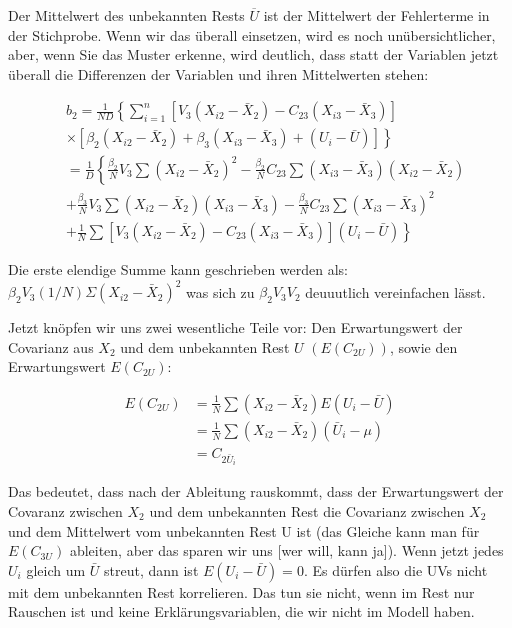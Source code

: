 \documentclass[
  10pt,
  letterpaper,
  a4paper, twoside]{scrreprt}
\begin{document}
\begin{tcolorbox}
Der Mittelwert des unbekannten Rests \(\overline{U}\) ist der Mittelwert
der Fehlerterme in der Stichprobe. Wenn wir das überall einsetzen, wird
es noch unübersichtlicher, aber, wenn Sie das Muster erkenne, wird
deutlich, dass statt der Variablen jetzt überall die Differenzen der
Variablen und ihren Mittelwerten stehen:

\begin{align}
& b_2=\frac{1}{N D}\left\{\sum_{i=1}^n\left[V_3\left(X_{i 2}-\bar{X}_2\right)-C_{23}\left(X_{i 3}-\bar{X}_3\right)\right]\right. \\
&\left.\times\left[\beta_2\left(X_{i 2}-\bar{X}_2\right)+\beta_3\left(X_{i 3}-\bar{X}_3\right)+\left(U_i-\bar{U}\right)\right]\right\} \\
&=\frac{1}{D}\left\{\frac{\beta_2}{N} V_3 \sum\left(X_{i 2}-\bar{X}_2\right)^2-\frac{\beta_2}{N} C_{23} \sum\left(X_{i 3}-\bar{X}_3\right)\left(X_{i 2}-\bar{X}_2\right)\right. \\
&+\frac{\beta_3}{N} V_3 \sum\left(X_{i 2}-\bar{X}_2\right)\left(X_{i 3}-\bar{X}_3\right)-\frac{\beta_3}{N} C_{23} \sum\left(X_{i 3}-\bar{X}_3\right)^2 \\
&\left.+\frac{1}{N} \sum\left[V_3\left(X_{i 2}-\bar{X}_2\right)-C_{23}\left(X_{i 3}-\bar{X}_3\right)\right]\left(U_i-\bar{U}\right)\right\}
\end{align}

Die erste elendige Summe kann geschrieben werden als:
\(\beta_2 V_3(1 / N) \Sigma\left(X_{i 2}-\bar{X}_2\right)^2\) was sich
zu \(\beta_2 V_3 V_2\) deuuutlich vereinfachen lässt.

Jetzt knöpfen wir uns zwei wesentliche Teile vor: Den Erwartungswert der
Covarianz aus \(X_2\) und dem unbekannten Rest \(U\) \((E(C_{2 U}))\),
sowie den Erwartungswert \(E(C_{2 U})\):

\begin{align}
E\left(C_{2 U}\right)&=\frac{1}{N} \sum\left(X_{i 2}-\bar{X}_2\right) E\left(U_i-\bar{U}\right)\\
&=\frac{1}{N} \sum\left(X_{i 2}-\bar{X}_2\right)\left(\bar{U}_i-\mu\right)\\
&=C_{2 \bar{U}_i} 
\end{align}

Das bedeutet, dass nach der Ableitung rauskommt, dass der Erwartungswert
der Covaranz zwischen \(X_2\) und dem unbekannten Rest die Covarianz
zwischen \(X_2\) und dem Mittelwert vom unbekannten Rest U ist (das
Gleiche kann man für \(E(C_{3 U})\) ableiten, aber das sparen wir uns
{[}wer will, kann ja{]}). Wenn jetzt jedes \(U_i\) gleich um \(\bar{U}\)
streut, dann ist \(E(U_i-\bar{U})=0\). Es dürfen also die UVs nicht mit
dem unbekannten Rest korrelieren. Das tun sie nicht, wenn im Rest nur
Rauschen ist und keine Erklärungsvariablen, die wir nicht im Modell
haben.


\end{tcolorbox}
\end{document}
